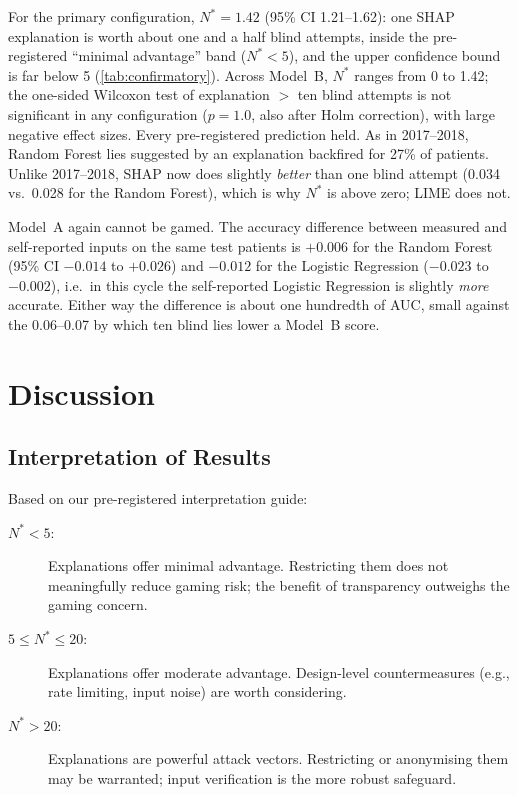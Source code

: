 \documentclass[12pt, a4paper, oneside]{report}
\theoremstyle{definition}
\begin{document}
For the primary configuration, $N^* = 1.42$ (95\% CI 1.21--1.62): one
SHAP explanation is worth about one and a half blind attempts, inside
the pre-registered ``minimal advantage'' band ($N^* < 5$), and the
upper confidence bound is far below 5 (\cref{tab:confirmatory}).
Across Model~B, $N^*$ ranges from 0 to 1.42; the one-sided Wilcoxon
test of explanation $>$ ten blind attempts is not significant in any
configuration ($p = 1.0$, also after Holm correction), with large
negative effect sizes.  Every pre-registered prediction held.  As in
2017--2018, Random Forest lies suggested by an explanation backfired
for 27\% of patients.  Unlike 2017--2018, SHAP now does slightly
\emph{better} than one blind attempt (0.034 vs.\ 0.028 for the Random
Forest), which is why $N^*$ is above zero; LIME does not.

Model~A again cannot be gamed.  The accuracy difference between
measured and self-reported inputs on the same test patients is $+0.006$
for the Random Forest (95\% CI $-0.014$ to $+0.026$) and $-0.012$ for
the Logistic Regression ($-0.023$ to $-0.002$), i.e.\ in this cycle the
self-reported Logistic Regression is slightly \emph{more} accurate.
Either way the difference is about one hundredth of AUC, small against
the 0.06--0.07 by which ten blind lies lower a Model~B score.

\chapter{Discussion}
\label{chap:discussion}

\section{Interpretation of Results}

Based on our pre-registered interpretation guide:
\begin{description}
  \item[$N^* < 5$:] Explanations offer minimal advantage. Restricting
       them does not meaningfully reduce gaming risk; the benefit of
       transparency outweighs the gaming concern.
  \item[$5 \leq N^* \leq 20$:] Explanations offer moderate advantage.
       Design-level countermeasures (e.g., rate limiting, input noise)
       are worth considering.
  \item[$N^* > 20$:] Explanations are powerful attack vectors.
       Restricting or anonymising them may be warranted; input
       verification is the more robust safeguard.
\end{description}
\end{document}
